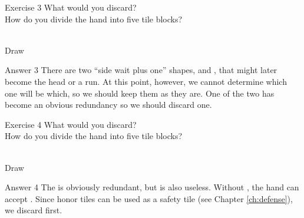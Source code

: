 \vfill

\begin{itembox}[l]{Exercise 3}
What would you discard? \\
\vsp
How do you divide the hand into five tile blocks? 

\bp
{}~\\
\hfill\footnotesize{Draw~~~~~~~~~~~}
\ep
\end{itembox}


\newpage

\begin{itembox}[r]{Answer 3}
\emj
There are two ``side wait plus one'' shapes, {\LARGE{}} and {\LARGE{}}, that might later become the head or a run. At this point, however, we cannot determine which one will be which, so we should keep them as they are. 
One of the two {\LARGE{}} has become an obvious redundancy so we should discard one. 
\end{itembox}

\vfill

\begin{itembox}[l]{Exercise 4}
What would you discard? \\
\vsp
How do you divide the hand into five tile blocks? 

\bp
{}\bei~\\
\hfill\footnotesize{Draw~~~~~~~~~~~}
\ep
\end{itembox}


\newpage

\begin{itembox}[r]{Answer 4}
\emj
The {\LARGE\bei} is obviously redundant, but {\LARGE{}} is also useless. Without {\LARGE{}}, the hand can accept {\LARGE{}}. Since honor tiles can be used as a safety tile (see Chapter \ref{ch:defense}), we discard {\LARGE{}} first. 
\end{itembox}

